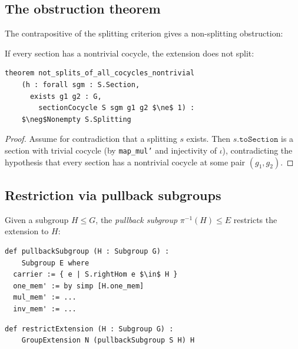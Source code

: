 \documentclass[11pt]{article}
\newcommand{\lean}[1]{\texttt{#1}}
\begin{document}
\subsection{The obstruction theorem}\label{sec:obstruction}

The contrapositive of the splitting criterion gives a non-splitting obstruction:

\begin{theorem}\label{thm:obstruction}
If every section has a nontrivial cocycle, the extension does not split:
\begin{lstlisting}[mathescape=true]
theorem not_splits_of_all_cocycles_nontrivial
    (h : forall sgm : S.Section,
      exists g1 g2 : G,
        sectionCocycle S sgm g1 g2 $\ne$ 1) :
    $\neg$Nonempty S.Splitting
\end{lstlisting}
\end{theorem}

\begin{proof}
Assume for contradiction that a splitting $s$ exists.  Then $s.\lean{toSection}$
is a section with trivial cocycle (by \lean{map\_mul'} and injectivity of $\iota$),
contradicting the hypothesis that every section has a nontrivial cocycle at some
pair $(g_1, g_2)$.
\end{proof}

\subsection{Restriction via pullback subgroups}\label{sec:restriction}

Given a subgroup $H \le G$, the \emph{pullback subgroup} $\pi^{-1}(H) \le E$
restricts the extension to $H$:

\begin{definition}\label{def:pullback}
\begin{lstlisting}[mathescape=true]
def pullbackSubgroup (H : Subgroup G) :
    Subgroup E where
  carrier := { e | S.rightHom e $\in$ H }
  one_mem' := by simp [H.one_mem]
  mul_mem' := ...
  inv_mem' := ...
\end{lstlisting}
\end{definition}

\begin{definition}\label{def:restrict}
\begin{lstlisting}
def restrictExtension (H : Subgroup G) :
    GroupExtension N (pullbackSubgroup S H) H
\end{lstlisting}
\end{definition}
\end{document}
